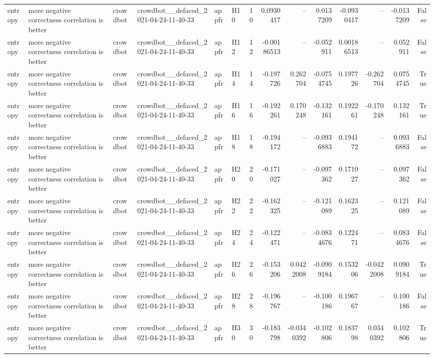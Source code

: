 \begin{longtable}{llllllrrrrrrrr}
entropy & more negative correctness correlation is better & crowdbot & crowdbot\_\_defaced\_2021-04-24-11-40-33 & appfr & H10 & 10 & 0.0930417 & -- & 0.0137209 & -0.0930417 & -- & -0.0137209 & False \\
entropy & more negative correctness correlation is better & crowdbot & crowdbot\_\_defaced\_2021-04-24-11-40-33 & appfr & H12 & 12 & -0.00186513 & -- & -0.052911 & 0.00186513 & -- & 0.052911 & False \\
entropy & more negative correctness correlation is better & crowdbot & crowdbot\_\_defaced\_2021-04-24-11-40-33 & appfr & H14 & 14 & -0.197726 & 0.262704 & -0.0754745 & 0.197726 & -0.262704 & 0.0754745 & True \\
entropy & more negative correctness correlation is better & crowdbot & crowdbot\_\_defaced\_2021-04-24-11-40-33 & appfr & H16 & 16 & -0.192261 & 0.170248 & -0.132161 & 0.192261 & -0.170248 & 0.132161 & True \\
entropy & more negative correctness correlation is better & crowdbot & crowdbot\_\_defaced\_2021-04-24-11-40-33 & appfr & H18 & 18 & -0.194172 & -- & -0.0936883 & 0.194172 & -- & 0.0936883 & False \\
entropy & more negative correctness correlation is better & crowdbot & crowdbot\_\_defaced\_2021-04-24-11-40-33 & appfr & H20 & 20 & -0.171027 & -- & -0.097362 & 0.171027 & -- & 0.097362 & False \\
entropy & more negative correctness correlation is better & crowdbot & crowdbot\_\_defaced\_2021-04-24-11-40-33 & appfr & H22 & 22 & -0.162325 & -- & -0.121089 & 0.162325 & -- & 0.121089 & False \\
entropy & more negative correctness correlation is better & crowdbot & crowdbot\_\_defaced\_2021-04-24-11-40-33 & appfr & H24 & 24 & -0.122471 & -- & -0.0834676 & 0.122471 & -- & 0.0834676 & False \\
entropy & more negative correctness correlation is better & crowdbot & crowdbot\_\_defaced\_2021-04-24-11-40-33 & appfr & H26 & 26 & -0.153206 & 0.0422008 & -0.0909184 & 0.153206 & -0.0422008 & 0.0909184 & True \\
entropy & more negative correctness correlation is better & crowdbot & crowdbot\_\_defaced\_2021-04-24-11-40-33 & appfr & H28 & 28 & -0.196767 & -- & -0.100186 & 0.196767 & -- & 0.100186 & False \\
entropy & more negative correctness correlation is better & crowdbot & crowdbot\_\_defaced\_2021-04-24-11-40-33 & appfr & H30 & 30 & -0.183798 & -0.0340392 & -0.102806 & 0.183798 & 0.0340392 & 0.102806 & True \\

\end{longtable}
